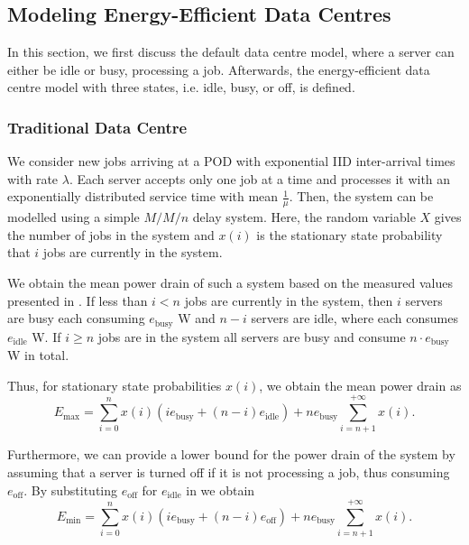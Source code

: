 \subsection{Modeling Energy-Efficient Data Centres}\label{sec:cloud:data_centers:modeling}
In this section, we first discuss the default data centre model, where a server can either be idle or busy, processing a job. Afterwards, the energy-efficient data centre model with three states, i.e. idle, busy, or off, is defined.

\subsubsection*{Traditional Data Centre}\label{sec:cloud:data_centers:modeling:default}
We consider new jobs arriving at a \gls{POD} with exponential \gls{IID} inter-arrival times with rate \(\lambda\).
Each server accepts only one job at a time and processes it with an exponentially distributed service time with mean \(\frac{1}{\mu}\).
Then, the system can be modelled using a simple \(M/M/n\) delay system.
Here, the random variable \(X\) gives the number of jobs in the system and \(x(i)\) is the stationary state probability that \(i\) jobs are currently in the system.

We obtain the mean power drain of such a system based on the measured values presented in .
If less than \(i < n\) jobs are currently in the system, then \(i\) servers are busy each consuming \(e_\text{busy}\) \si{\watt} and \(n-i\) servers are idle, where each consumes \(e_\text{idle}\) \si{\watt}.
If \(i \geq n\) jobs are in the system all servers are busy and consume \(n\cdot e_\text{busy}\) \si{\watt} in total.

Thus, for stationary state probabilities \(x(i)\), we obtain the mean power drain as
\begin{equation}\label{sec:cloud:data_centers:modeling:default:emax}
E_\text{max} = \sum_{i=0}^{n} x(i) (i e_\text{busy} + (n-i) e_\text{idle}) + ne_\text{busy} \sum_{i=n + 1}^{+ \infty} x(i).
\end{equation}

Furthermore, we can provide a lower bound for the power drain of the system by assuming that a server is turned off if it is not processing a job, thus consuming \(e_\text{off}\).
By substituting \(e_\text{off}\) for \(e_\text{idle}\) in  we obtain
\begin{equation*}
E_\text{min} = \sum_{i=0}^{n} x(i) (i e_\text{busy} + (n-i) e_\text{off}) + ne_\text{busy} \sum_{i=n + 1}^{+ \infty} x(i).
\end{equation*}

